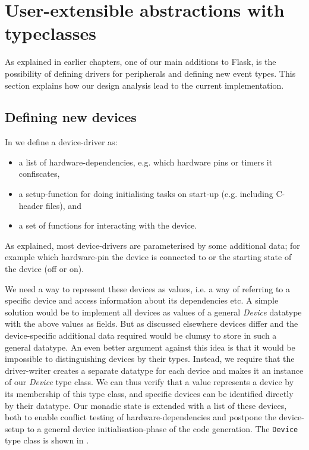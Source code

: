 \documentclass[a4paper, oneside, final]{memoir}
\let\fref\undefined
\let\Fref\undefined
\begin{document}
\section{User-extensible abstractions with typeclasses}
\label{sec:user-extens-abstr}
As explained in earlier chapters, one of our main additions to Flask,
is the possibility of defining drivers for peripherals and defining
new event types. This section explains how our design analysis lead to
the current implementation.

\subsection{Defining new devices}
In \fref{sec:devices} we define a device-driver as:
\begin{itemize}
\item a list of hardware-dependencies, e.g. which hardware pins or
  timers it confiscates,
\item a setup-function for doing initialising tasks on start-up
  (e.g. including C-header files), and
\item a set of functions for interacting with the device.
\end{itemize}

As explained, most device-drivers are parameterised by some additional
data; for example which hardware-pin the device is connected to or the
starting state of the device (off or on).

We need a way to represent these devices as values, i.e. a way of
referring to a specific device and access information about its
dependencies etc. A simple solution would be to implement all devices
as values of a general \textit{Device} datatype with the above values
as fields. But as discussed elsewhere devices differ and the
device-specific additional data required would be clumsy to store in
such a general datatype.  An even better argument against this idea is
that it would be impossible to distinguishing devices by their
types. Instead, we require that the driver-writer creates a separate
datatype for each device and makes it an instance of our
\textit{Device} type class. We can thus verify that a value represents
a device by its membership of this type class, and specific devices
can be identified directly by their datatype. Our monadic state is
extended with a list of these devices, both to enable conflict testing
of hardware-dependencies and postpone the device-setup to a general
device initialisation-phase of the code generation. The \verb|Device|
type class is shown in \Fref{fig:device typeclass}.
\end{document}

